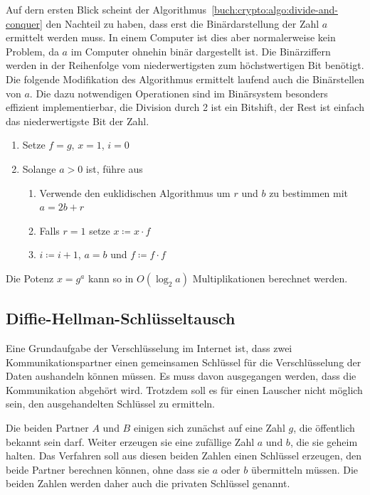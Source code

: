Auf dern ersten Blick scheint der
Algorithmus~\ref{buch:crypto:algo:divide-and-conquer}
den Nachteil zu haben, dass erst die Binärdarstellung der Zahl $a$ 
ermittelt werden muss.
In einem Computer ist dies aber normalerweise kein Problem, da $a$
im Computer ohnehin binär dargestellt ist.
Die Binärziffern werden in der Reihenfolge vom niederwertigsten zum
höchstwertigen Bit benötigt.
Die folgende Modifikation des Algorithmus ermittelt laufend
auch die Binärstellen von $a$.
Die dazu notwendigen Operationen sind im Binärsystem besonders
effizient implementierbar, die Division durch 2 ist ein Bitshift, der
Rest ist einfach das niederwertigste Bit der Zahl.

\begin{algorithmus}
\label{buch:crypto:algo:divide-and-conquer2}
\begin{enumerate}
\item
Setze $f=g$, $x=1$, $i=0$
\item
Solange $a>0$ ist, führe aus
\begin{enumerate}
\item
Verwende den euklidischen Algorithmus um $r$ und $b$ zu bestimmen mit $a=2b+r$
\item
Falls $r=1$ setze $x \coloneqq x \cdot f$
\item
$i \coloneqq i+1$, $a = b$ und $f\coloneqq f\cdot f$
\end{enumerate}
\end{enumerate}
Die Potenz $x=g^a$ kann so in $O(\log_2a)$ Multiplikationen
berechnet werden.
\end{algorithmus}


%
%
\subsection{Diffie-Hellman-Schlüsseltausch
\label{buch:subsection:diffie-hellman}}
Eine Grundaufgabe der Verschlüsselung im Internet ist, dass zwei
Kommunikationspartner einen gemeinsamen Schlüssel für die Verschlüsselung
der Daten aushandeln können müssen.
Es muss davon ausgegangen werden, dass die Kommunikation abgehört wird.
Trotzdem soll es für einen Lauscher nicht möglich sein, den 
ausgehandelten Schlüssel zu ermitteln.


Die beiden Partner $A$ und $B$ einigen sich zunächst auf eine Zahl $g$,
die öffentlich bekannt sein darf.
Weiter erzeugen sie eine zufällige Zahl $a$ und $b$, die sie geheim
halten.
Das Verfahren soll aus diesen beiden Zahlen einen Schlüssel erzeugen,
den beide Partner berechnen können, ohne dass sie $a$ oder $b$ 
übermitteln müssen.
Die beiden Zahlen werden daher auch die privaten Schlüssel genannt.

